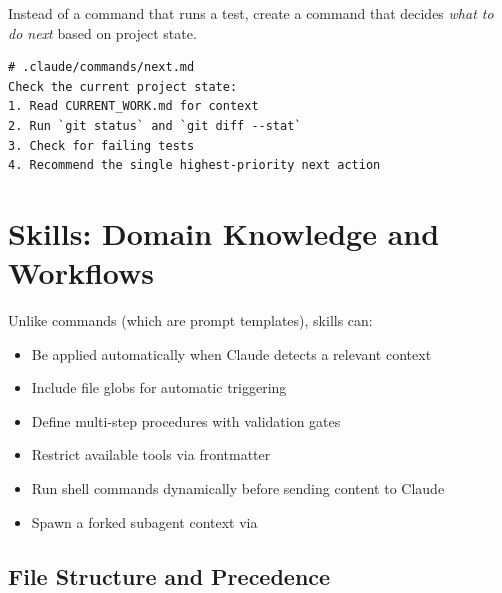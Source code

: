 Instead of a command that runs a test, create a command that decides
\emph{what to do next} based on project state.

\begin{verbatim}
# .claude/commands/next.md
Check the current project state:
1. Read CURRENT_WORK.md for context
2. Run `git status` and `git diff --stat`
3. Check for failing tests
4. Recommend the single highest-priority next action
\end{verbatim}


\section{Skills: Domain Knowledge and Workflows}
\label{sec:skills}


Unlike commands (which are prompt templates), skills can:

\begin{itemize}
  \item Be applied automatically when Claude detects a relevant context
  \item Include file globs for automatic triggering
  \item Define multi-step procedures with validation gates
  \item Restrict available tools via  frontmatter
  \item Run shell commands dynamically before sending content to Claude
  \item Spawn a forked subagent context via 
\end{itemize}

\subsection{File Structure and Precedence}

